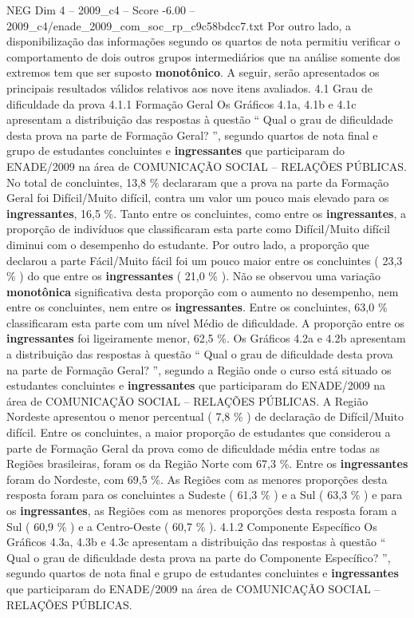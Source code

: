 \begin{textsample}{NEG Dim 4 – 2009\_c4 – Score -6.00 – 2009\_c4/enade\_2009\_com\_soc\_rp\_c9c58bdcc7.txt}
Por outro lado, a disponibilização das informações segundo os quartos de nota permitiu verificar o comportamento de dois outros grupos intermediários que na análise somente dos extremos tem que ser suposto \textbf{monotônico}.
A seguir, serão apresentados os principais resultados válidos relativos aos nove itens avaliados. 4.1 Grau de dificuldade da prova 4.1.1 Formação Geral Os Gráficos 4.1a, 4.1b e 4.1c apresentam a distribuição das respostas à questão “ Qual o grau de dificuldade desta prova na parte de Formação Geral? ”, segundo quartos de nota final e grupo de estudantes concluintes e \textbf{ingressantes} que participaram do ENADE/2009 na área de COMUNICAÇÃO SOCIAL – RELAÇÕES PÚBLICAS.
No total de concluintes, 13,8 \% declararam que a prova na parte da Formação Geral foi Difícil/Muito difícil, contra um valor um pouco mais elevado para os \textbf{ingressantes}, 16,5 \%.
Tanto entre os concluintes, como entre os \textbf{ingressantes}, a proporção de indivíduos que classificaram esta parte como Difícil/Muito difícil diminui com o desempenho do estudante.
Por outro lado, a proporção que declarou a parte Fácil/Muito fácil foi um pouco maior entre os concluintes ( 23,3 \% ) do que entre os \textbf{ingressantes} ( 21,0 \% ).
Não se observou uma variação \textbf{monotônica} significativa desta proporção com o aumento no desempenho, nem entre os concluintes, nem entre os \textbf{ingressantes}.
Entre os concluintes, 63,0 \% classificaram esta parte com um nível Médio de dificuldade.
A proporção entre os \textbf{ingressantes} foi ligeiramente menor, 62,5 \%.
Os Gráficos 4.2a e 4.2b apresentam a distribuição das respostas à questão “ Qual o grau de dificuldade desta prova na parte de Formação Geral? ”, segundo a Região onde o curso está situado os estudantes concluintes e \textbf{ingressantes} que participaram do ENADE/2009 na área de COMUNICAÇÃO SOCIAL – RELAÇÕES PÚBLICAS.
A Região Nordeste apresentou o menor percentual ( 7,8 \% ) de declaração de Difícil/Muito difícil.
Entre os concluintes, a maior proporção de estudantes que considerou a parte de Formação Geral da prova como de dificuldade média entre todas as Regiões brasileiras, foram os da Região Norte com 67,3 \%.
Entre os \textbf{ingressantes} foram do Nordeste, com 69,5 \%.
As Regiões com as menores proporções desta resposta foram para os concluintes a Sudeste ( 61,3 \% ) e a Sul ( 63,3 \% ) e para os \textbf{ingressantes}, as Regiões com as menores proporções desta resposta foram a Sul ( 60,9 \% ) e a Centro-Oeste ( 60,7 \% ). 4.1.2 Componente Específico Os Gráficos 4.3a, 4.3b e 4.3c apresentam a distribuição das respostas à questão “ Qual o grau de dificuldade desta prova na parte do Componente Específico? ”, segundo quartos de nota final e grupo de estudantes concluintes e \textbf{ingressantes} que participaram do ENADE/2009 na área de COMUNICAÇÃO SOCIAL – RELAÇÕES PÚBLICAS.

\end{textsample}
